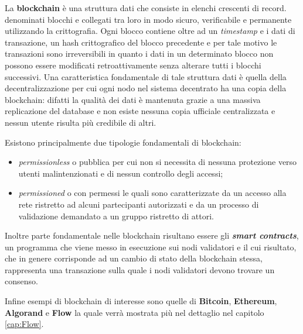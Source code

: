 La \textbf{blockchain} è una struttura dati che consiste in elenchi crescenti di record. denominati blocchi e collegati tra loro in modo sicuro, verificabile e permanente utilizzando la crittografia. Ogni blocco contiene oltre ad un \textit{timestamp} e i dati di transazione, un hash crittografico del blocco precedente e per tale motivo le transazioni sono irreversibili in quanto i dati in un determinato blocco non possono essere modificati retroattivamente senza alterare tutti i blocchi successivi. 
Una caratteristica fondamentale di tale struttura dati è quella della decentralizzazione per cui ogni nodo nel sistema decentrato ha una copia della blockchain: difatti la qualità dei dati è mantenuta grazie a una massiva replicazione del database e non esiste nessuna copia ufficiale centralizzata e nessun utente risulta più credibile di altri.

Esistono principalmente due tipologie fondamentali di blockchain:
\begin{itemize}
    \item \textit{permissionless} o pubblica per cui non si necessita di nessuna protezione verso utenti malintenzionati e di nessun controllo degli accessi;
    \item \textit{permissioned} o con permessi le quali sono caratterizzate da un accesso alla rete ristretto ad alcuni partecipanti autorizzati e da un processo di validazione demandato a un gruppo ristretto di attori.
\end{itemize}

Inoltre parte fondamentale nelle blockchain risultano essere gli \textit{\textbf{smart contracts}}, un programma che viene messo in esecuzione sui nodi validatori e il cui risultato, che in genere corrisponde ad un cambio di stato della blockchain stessa, rappresenta una transazione sulla quale i nodi validatori devono trovare un consenso.

Infine esempi di blockchain di interesse sono quelle di \textbf{Bitcoin}, \textbf{Ethereum}, \textbf{Algorand} e \textbf{Flow} la quale verrà mostrata più nel dettaglio nel capitolo \ref{cap:Flow}.